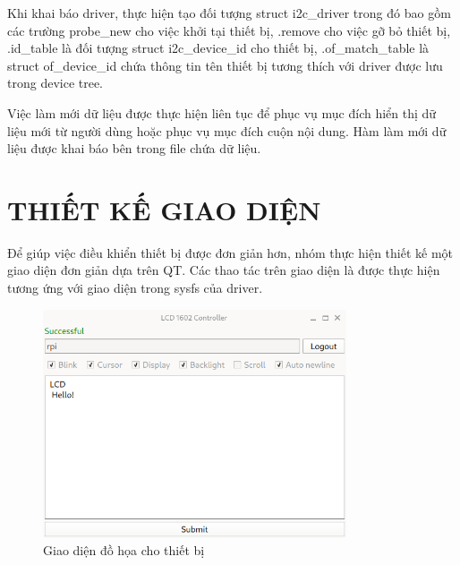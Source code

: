 \documentclass{report}
\begin{document}
Khi khai báo driver, thực hiện tạo đối tượng struct i2c\_driver trong đó bao gồm các trường probe\_new cho việc khởi tại thiết bị, .remove cho việc 	gỡ bỏ thiết bị, .id\_table là đối tượng struct i2c\_device\_id cho thiết bị, .of\_match\_table là struct of\_device\_id chứa thông tin tên thiết bị tương thích với driver được lưu trong device tree.


Việc làm mới dữ liệu được thực hiện liên tục để phục vụ mục đích hiển thị dữ liệu mới từ người dùng hoặc phục vụ mục đích cuộn nội dung. Hàm làm mới dữ liệu được khai báo bên trong file chứa dữ liệu.



\chapter{THIẾT KẾ GIAO DIỆN}
Để giúp việc điều khiển thiết bị được đơn giản hơn, nhóm thực hiện thiết kế một giao diện đơn giản dựa trên QT. Các thao tác trên giao diện là được thực hiện tương ứng với giao diện trong sysfs của driver.

\begin{figure}[H]
	\centering
	\includegraphics[width=0.8\textwidth]{images/gui.png}
	\caption{Giao diện đồ họa cho thiết bị}
\end{figure}
\end{document}

